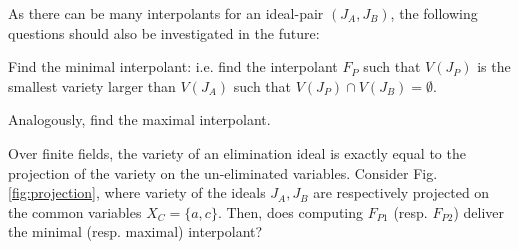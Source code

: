 As there can be many interpolants for an ideal-pair $(J_A, J_B)$, 
the following questions should also be investigated in the future:
\bi
\item Find the minimal interpolant: i.e. find the interpolant $F_P$
  such that $V(J_P)$ is the smallest variety larger than $V(J_A)$ such
  that $V(J_P) \cap V(J_B) = \emptyset$.
\item Analogously, find the maximal interpolant. 
\item Over finite fields, the variety of an elimination ideal is
  exactly equal to the projection of the variety on the un-eliminated
  variables. Consider Fig. \ref{fig:projection}, where variety of the
  ideals $J_A, J_B$ are respectively projected on the common variables
  $X_C = \{a, c\}$. Then, does computing $F_{P1}$ (resp. $F_{P2}$) 
  deliver the minimal (resp. maximal) interpolant?
\ei

\begin{figure}[h]
\end{figure}

% 

